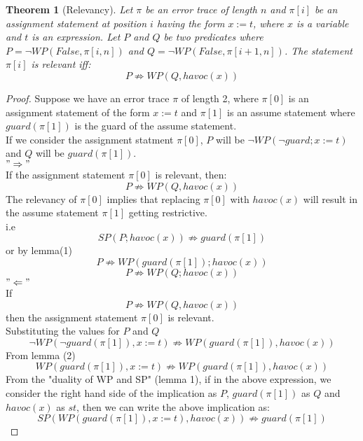 \documentclass{article}
\newcommand{\limp}{\Rightarrow}
\newtheorem{theorem}{Theorem}
\begin{document}
\begin{theorem}[Relevancy]
Let $\pi$ be an error trace of length $n$ and $\pi[i]$ be an assignment statement at position $i$ having the form $x:=t$, where $x$ is a variable and $t$ is an expression. Let $P$ and $Q$ be two predicates where $P = \neg WP(False, \pi[i,n])$ and $Q =  \neg WP(False, \pi[i+1,n])$. The statement $\pi[i]$ is relevant iff:
 $$P \not \limp WP(Q,havoc(x))$$
\end{theorem}
\begin{proof}
Suppose we have an error trace $\pi$ of length 2, where $\pi[0]$ is an assignment statement of the form $x:=t$ and $\pi[1]$ is an assume statement where $guard(\pi[1])$ is the guard of the assume statement.\\
If we consider the assignment statment $\pi[0]$, $P$ will be $\neg WP(\neg guard; x:=t)$ and $Q$ will be $guard(\pi[1])$.\\
$"\Rightarrow"$ \\
If the assignment statement $\pi[0]$ is relevant, then:
\begin{equation} 
P \not\limp WP(Q,havoc(x)) 
\end{equation}
The relevancy of $\pi[0]$ implies that replacing $\pi[0]$ with $havoc(x)$ will result in the assume statement $\pi[1]$ getting restrictive.\\
i.e 
$$SP(P; havoc(x)) \not\limp guard(\pi[1])$$
or by lemma(1) 
$$P \not\limp WP(guard(\pi[1]); havoc(x))$$
$$P \not\limp WP(Q; havoc(x))$$
$"\Leftarrow"$\\
If
\begin{equation} 
P \not\limp WP(Q,havoc(x)) 
\end{equation}
then the assignment statement $\pi[0]$ is relevant.\\
Substituting the values for $P$ and $Q$\\
$$\neg WP(\neg guard(\pi[1]), x:=t) \not\limp WP(guard(\pi[1]), havoc(x))$$
From lemma (2)
\begin{equation}
WP(guard(\pi[1]), x:=t) \not\limp WP(guard(\pi[1]), havoc(x))
\end{equation}
From the "duality of WP and SP" (lemma 1), if in the above expression, we consider the right hand side of the implication as $P$, $guard(\pi[1])$ as $Q$ and $havoc(x)$ as $st$, then we can write the above implication as: \\
\begin{equation}
SP(WP(guard(\pi[1]), x:=t), havoc(x)) \not\limp guard(\pi[1])
\end{equation}

\end{proof}
\end{document}
